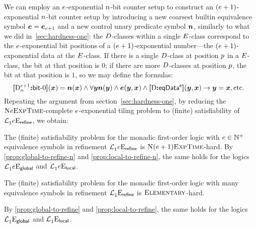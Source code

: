 We can employ an $e$-exponential $n$-bit counter setup to construct an
$(e+1)$-exponential $n$-bit counter setup by introducing a new coarsest
builtin equivalence symbol $\bm{e} = \bm{e}_{e+1}$ and a new control unary
predicate symbol $\bm{n}$, similarly to what we did in~\cref{sec:hardness-one}:
the $D$-classes within a single $E$-class correspond to the
$e$-exponential bit positions of a $(e+1)$-exponential number---the
$(e+1)$-exponential data at the $E$-class. If there is a single
$D$-class at position $p$ in a $E$-class, the bit at that position
is $0$; if there are more $D$-classes at position $p$, the bit at that
position is $1$, so we may define the formulas:
\[
  {\bm{[}\mathrm{D}_n^{e+1}\mathord{\bm{:}}\mathsf{bit}{\hbox{-}}0\bm{]}}(\bm{x}) = \bm{n}(\bm{x}) \land \forall\bm{y} \bm{n}(\bm{y}) \land
  \bm{e}(\bm{y},\bm{x}) \land {\bm{[}\mathrm{D}\mathord{\bm{:}}\mathsf{eqData^{e}}\bm{]}}(\bm{y},\bm{x}) \rightarrow \bm{y} = \bm{x}, \text{etc.}
\]
Repeating the argument from section~\cref{sec:hardness-one}, by reducing the
$\text{\normalfont{\scshape N}}e\text{\normalfont{\scshape ExpTime}}$-complete $e$-exponential tiling problem to (finite)
satisfiability of $\mathcal{L}^{{}}_{1}{e}\mathrm{E}_{\mathsf{refine}}$, we obtain:
\begin{proposition}
The (finite) satisfiability problem for the monadic first-order logic with
$e \in \mathbb{N}^{+}$ equivalence symbols in refinement
$\mathcal{L}^{{}}_{1}{e}\mathrm{E}_{\mathsf{refine}}$ is $\text{\normalfont{\scshape N}}(e+1)\text{\normalfont{\scshape ExpTime}}$-hard.
By \cref{prop:global-to-refine-n} and \cref{prop:local-to-refine-n}, the same
holds for the logics $\mathcal{L}^{{}}_{1}{e}\mathrm{E}_{\mathsf{global}}$ and
$\mathcal{L}^{{}}_{1}{e}\mathrm{E}_{\mathsf{local}}$.
\end{proposition}

\begin{proposition}
The (finite) satisfiability problem for the monadic first-order logic with many
equivalence symbols in refinement $\mathcal{L}^{{}}_{1}{{}}\mathrm{E}_{\mathsf{refine}}$ is
$\text{\normalfont{\scshape Elementary}}$-hard.

By \cref{prop:global-to-refine} and \cref{prop:local-to-refine}, the same
holds for the logics $\mathcal{L}^{{}}_{1}{{}}\mathrm{E}_{\mathsf{global}}$ and
$\mathcal{L}^{{}}_{1}{{}}\mathrm{E}_{\mathsf{local}}$.
\end{proposition}